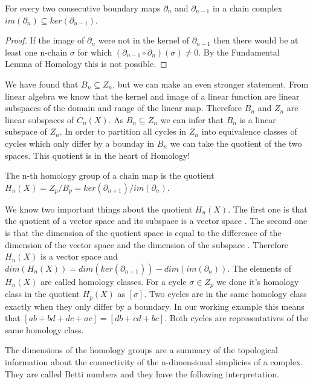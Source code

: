 \begin{cor}  For every two consecutive boundary maps $\partial_n$ and $\partial_{n-1}$ in a chain complex $im(\partial_n) \subseteq ker(\partial_{n-1})$. \end{cor}

\begin{proof}
    If the image of $\partial_n$ were not in the kernel of $\partial_{n-1}$ then there would be at least one n-chain $\sigma$ for which $(\partial_{n-1} \circ \partial_n) (\sigma) \ne 0$. By the Fundamental Lemma of Homology this is not possible.
\end{proof}

We have found that $B_n \subseteq Z_n$, but we can make an even stronger statement. From linear algebra \cite{lin-alg-done-right} we know that the kernel and image of a linear function are linear subspaces of the domain and range of the linear map. Therefore $B_n$ and $Z_n$ are linear subspaces of $C_n(X)$. As $B_n \subseteq Z_n$ we can infer that $B_n$ is a linear subspace of $Z_n$. In order to partition all cycles in $Z_n$ into equivalence classes of cycles which only differ by a bounday in $B_n$ we can take the quotient of the two spaces. This quotient is in the heart of Homology!

\begin{defn} The n-th homology group of a chain map is the quotient $H_n(X) = Z_p \big/ B_p = ker(\partial_{n+1})\big/im(\partial_n)$. \end{defn}

We know two important things about the quotient $H_n(X)$. The first one is that the quotient of a vector space and its subspace is a vector space \cite{lin-alg-done-right}. The second one is that the dimension of the quotient space is equal to the difference of the dimension of the vector space and the dimension of the subspace \cite{lin-alg-done-right}. Therefore $H_n(X)$ is a vector space and $dim(H_n(X)) = dim(ker(\partial_{n+1})) - dim(im(\partial_n))$. The elements of $H_n(X)$ are called homology classes. For a cycle $\sigma \in Z_p$ we done it's homology class in the quotient $H_p(X)$ as $[\sigma]$. Two cycles are in the same homology class exactly when they only differ by a boundary. In our working example this means that $[ab + bd + dc + ac] = [db + cd + bc]$. Both cycles are representatives of the same homology class.

The dimensions of the homology groups are a summary of the topological information about the connectivity of the n-dimensional simplicies of a complex. They are called Betti numbers and they have the following interpretation.

